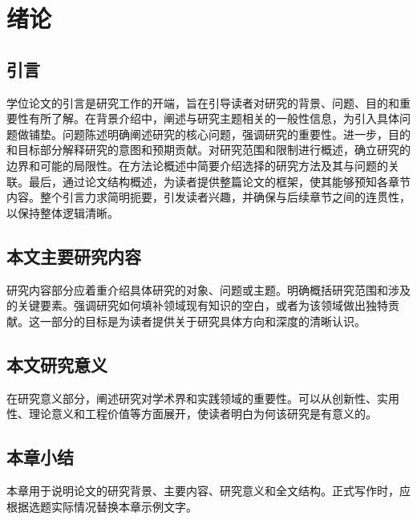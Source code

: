 
\section{绪论}

\subsection{引言}
\thesisbodyfont
学位论文的引言是研究工作的开端，旨在引导读者对研究的背景、问题、目的和重要性有所了解。在背景介绍中，阐述与研究主题相关的一般性信息，为引入具体问题做铺垫。问题陈述明确阐述研究的核心问题，强调研究的重要性。进一步，目的和目标部分解释研究的意图和预期贡献。对研究范围和限制进行概述，确立研究的边界和可能的局限性。在方法论概述中简要介绍选择的研究方法及其与问题的关联。最后，通过论文结构概述，为读者提供整篇论文的框架，使其能够预知各章节内容。整个引言力求简明扼要，引发读者兴趣，并确保与后续章节之间的连贯性，以保持整体逻辑清晰。

\subsection{本文主要研究内容}
\thesisbodyfont
研究内容部分应着重介绍具体研究的对象、问题或主题。明确概括研究范围和涉及的关键要素。强调研究如何填补领域现有知识的空白，或者为该领域做出独特贡献。这一部分的目标是为读者提供关于研究具体方向和深度的清晰认识。

\subsection{本文研究意义}
\thesisbodyfont
在研究意义部分，阐述研究对学术界和实践领域的重要性。可以从创新性、实用性、理论意义和工程价值等方面展开，使读者明白为何该研究是有意义的。

\subsection{本章小结}
\thesisbodyfont
本章用于说明论文的研究背景、主要内容、研究意义和全文结构。正式写作时，应根据选题实际情况替换本章示例文字。
